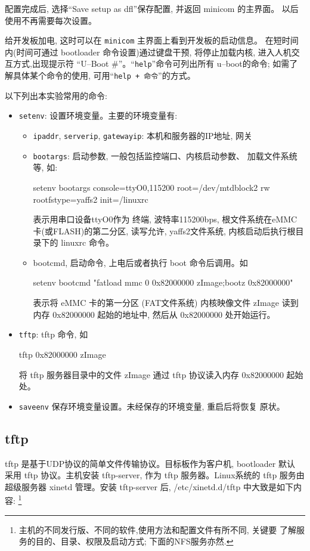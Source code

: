 配置完成后, 选择``Save setup as dfl''保存配置, 并返回 minicom 的主界面。
以后使用不再需要每次设置。

给开发板加电, 这时可以在 \verb|minicom| 主界面上看到开发板的启动信息。
在短时间内(时间可通过 bootloader 命令设置)通过键盘干预, 将停止加载内核,
进入人机交互方式,出现提示符 ``U--Boot \#''。``\verb|help|''命令可列出所有
u--boot的命令; 如需了解具体某个命令的使用, 可用``\verb|help + 命令|''的方式。

以下列出本实验常用的命令:
\begin{itemize}
    \item \verb|setenv|: 设置环境变量。主要的环境变量有:
    \begin{itemize}
        \item \verb|ipaddr|, \verb|serverip|, \verb|gatewayip|:
            本机和服务器的IP地址, 网关
        \item \verb|bootargs|: 启动参数, 一般包括监控端口、内核启动参数、
            加载文件系统等, 如:

\begin{blockcode}
setenv bootargs console=ttyO0,115200 root=/dev/mtdblock2 rw
        rootfstype=yaffs2 init=/linuxrc
\end{blockcode}
            表示用串口设备ttyO0作为
            终端, 波特率115200bps, 根文件系统在eMMC卡(或FLASH)的第二分区,
            读写允许, yaffs2文件系统, 内核启动后执行根目录下的 linuxrc 命令。
	    \item bootcmd, 启动命令, 上电后或者执行 boot 命令后调用。如
\begin{blockcode}
setenv bootcmd "fatload mmc 0 0x82000000 zImage;bootz 0x82000000"
\end{blockcode}
            表示将 eMMC 卡的第一分区 (FAT文件系统) 内核映像文件 zImage
            读到内存 0x82000000 起始的地址中, 然后从 0x82000000 处开始运行。
    \end{itemize}
    \item \verb|tftp|: tftp 命令, 如
\begin{blockcode}
tftp 0x82000000 zImage
\end{blockcode}
        将 tftp 服务器目录中的文件 zImage 通过 tftp 协议读入内存
        0x82000000 起始处。
    \item \verb|saveenv| 保存环境变量设置。未经保存的环境变量, 重启后将恢复
        原状。
\end{itemize}

\subsection{tftp}
tftp 是基于UDP协议的简单文件传输协议。目标板作为客户机, bootloader 默认
采用 tftp 协议。主机安装 tftp-server, 作为 tftp 服务器。Linux系统的 tftp
服务由超级服务器 xinetd 管理。安装 tftp-server 后, /etc/xinetd.d/tftp
中大致是如下内容:
\footnote{主机的不同发行版、不同的软件,使用方法和配置文件有所不同, 关键要
了解服务的目的、目录、权限及启动方式; 下面的NFS服务亦然.}

